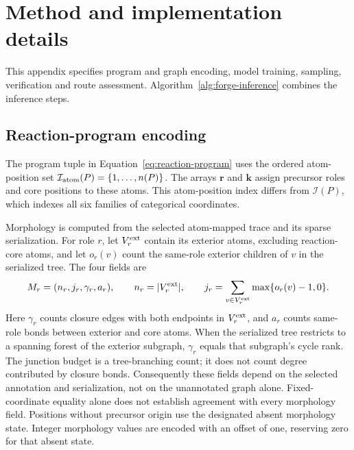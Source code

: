 \section{Method and implementation details}
\label{app:forge}

This appendix specifies program and graph encoding, model training, sampling, verification and
route assessment. Algorithm~\ref{alg:forge-inference} combines the inference steps.

\subsection{Reaction-program encoding}
\label{app:program-encoding}

The program tuple in Equation~\ref{eq:reaction-program} uses the ordered atom-position set
$\mathcal I_{\rm atom}(P)=\{1,\ldots,n(P)\}$. The arrays $\mathbf r$ and $\mathbf k$ assign
precursor roles and core positions to these atoms. This atom-position index differs from
$\mathcal I(P)$, which indexes all six families of categorical coordinates.

Morphology is computed from the selected atom-mapped trace and its sparse serialization.
For role $r$, let $V_r^{\rm ext}$ contain its exterior atoms, excluding reaction-core atoms, and
let $o_r(v)$ count the same-role exterior children of $v$ in the serialized tree. The four fields are
\begin{equation}
 M_r=(n_r,j_r,\gamma_r,a_r),\qquad
 n_r=|V_r^{\rm ext}|,\qquad
 j_r=\sum_{v\in V_r^{\rm ext}}\max\{o_r(v)-1,0\}.
\end{equation}
Here $\gamma_r$ counts closure edges with both endpoints in $V_r^{\rm ext}$, and $a_r$ counts
same-role bonds between exterior and core atoms. When the serialized tree restricts to a spanning
forest of the exterior subgraph, $\gamma_r$ equals that subgraph's cycle rank. The junction budget
is a tree-branching count; it does not count degree contributed by closure bonds. Consequently these
fields depend on the selected annotation and serialization, not on the unannotated graph alone.
Fixed-coordinate equality alone does not establish agreement with every morphology field.
Positions without precursor origin use the designated absent morphology state. Integer morphology
values are encoded with an offset of one, reserving zero for that absent state.

